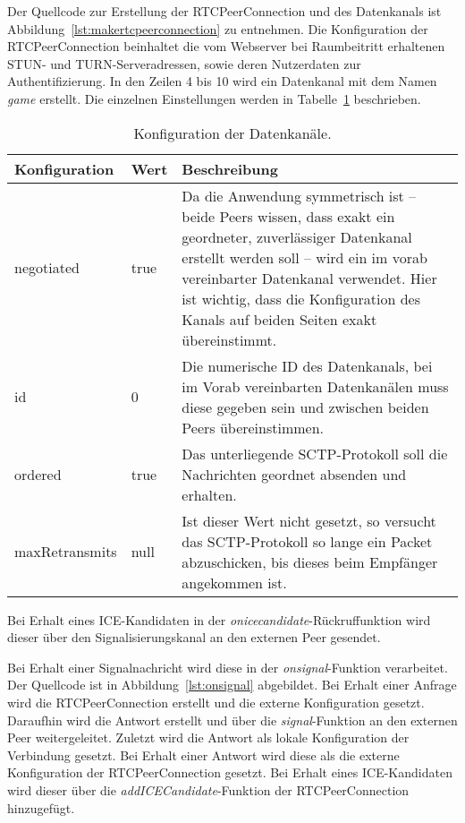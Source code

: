 Der Quellcode zur Erstellung der RTCPeerConnection und des Datenkanals ist Abbildung~\ref{lst:makertcpeerconnection} zu entnehmen. Die Konfiguration der RTCPeerConnection beinhaltet die vom Webserver bei Raumbeitritt erhaltenen STUN- und TURN-Serveradressen, sowie deren Nutzerdaten zur Authentifizierung. In den Zeilen 4 bis 10 wird ein Datenkanal mit dem Namen \textit{game} erstellt. Die einzelnen Einstellungen werden in Tabelle~\ref{table:dataChannelConfig} beschrieben.

\begin{table}[ht]
\centering
\begin{tabularx}{\textwidth}{llX}
\toprule
Konfiguration&Wert&Beschreibung\\

\midrule
negotiated&true&Da die Anwendung symmetrisch ist -- beide Peers wissen, dass exakt ein geordneter, zuverlässiger Datenkanal erstellt werden soll -- wird ein im vorab vereinbarter Datenkanal verwendet. Hier ist wichtig, dass die Konfiguration des Kanals auf beiden Seiten exakt übereinstimmt.\\
id&0&Die numerische ID des Datenkanals, bei im Vorab vereinbarten Datenkanälen muss diese gegeben sein und zwischen beiden Peers übereinstimmen.\\
ordered&true&Das unterliegende \acs{SCTP}-Protokoll soll die Nachrichten geordnet absenden und erhalten.\\
maxRetransmits&null&Ist dieser Wert nicht gesetzt, so versucht das  \acs{SCTP}-Protokoll so lange ein Packet abzuschicken, bis dieses beim Empfänger angekommen ist.\\
\bottomrule

\end{tabularx}
\caption{Konfiguration der Datenkanäle.}
\label{table:dataChannelConfig}
\end{table}

Bei Erhalt eines \acs{ICE}-Kandidaten in der \textit{onicecandidate}-Rückruffunktion wird dieser über den Signalisierungskanal an den externen Peer gesendet.\par

Bei Erhalt einer Signalnachricht wird diese in der \textit{onsignal}-Funktion verarbeitet. Der Quellcode ist in Abbildung~\ref{lst:onsignal} abgebildet. Bei Erhalt einer Anfrage wird die RTCPeerConnection erstellt und die externe Konfiguration gesetzt. Daraufhin wird die Antwort erstellt und über die \textit{signal}-Funktion an den externen Peer weitergeleitet. Zuletzt wird die Antwort als lokale Konfiguration der Verbindung gesetzt. Bei Erhalt einer Antwort wird diese als die externe Konfiguration der RTCPeerConnection gesetzt. Bei Erhalt eines \acs{ICE}-Kandidaten wird dieser über die \textit{addICECandidate}-Funktion der RTCPeerConnection hinzugefügt.

